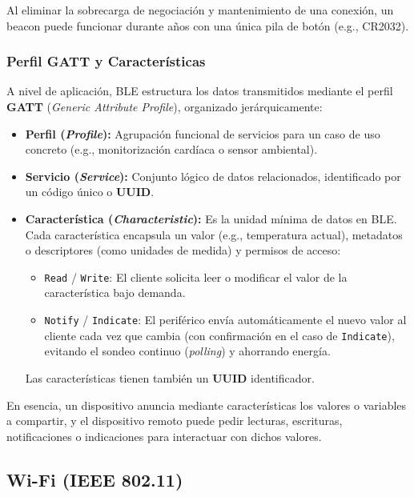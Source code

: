 \documentclass[../main.tex]{subfiles}
\begin{document}
                    Al eliminar la sobrecarga de negociación y mantenimiento de una conexión, un beacon puede funcionar durante años con una única pila de botón (e.g., CR2032).

            \subsubsection{Perfil GATT y Características}
                A nivel de aplicación, BLE estructura los datos transmitidos mediante el perfil \textbf{GATT} (\emph{Generic Attribute Profile}), organizado jerárquicamente:

                \begin{itemize}
                    \item \textbf{Perfil (\emph{Profile}):} Agrupación funcional de servicios para un caso de uso concreto (e.g., monitorización cardíaca o sensor ambiental).
                    \item \textbf{Servicio (\emph{Service}):} Conjunto lógico de datos relacionados, identificado por un código único o \textbf{UUID}.
                    \item \textbf{Característica (\emph{Characteristic}):} Es la unidad mínima de datos en BLE. Cada característica encapsula un valor (e.g., temperatura actual), metadatos o descriptores (como unidades de medida) y permisos de acceso:
                    \begin{itemize}
                        \item \texttt{Read} / \texttt{Write}: El cliente solicita leer o modificar el valor de la característica bajo demanda.
                        \item \texttt{Notify} / \texttt{Indicate}: El periférico envía automáticamente el nuevo valor al cliente cada vez que cambia (con confirmación en el caso de \texttt{Indicate}), evitando el sondeo continuo (\emph{polling}) y ahorrando energía.
                    \end{itemize}
                    Las características tienen también un \textbf{UUID} identificador.
                \end{itemize}

                En esencia, un dispositivo anuncia mediante características los valores o variables a compartir, y el dispositivo remoto puede pedir lecturas, escrituras, notificaciones o indicaciones para interactuar con dichos valores.

        \subsection{Wi-Fi (IEEE 802.11)}
\end{document}
